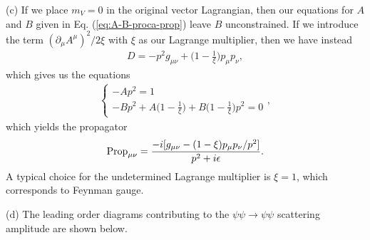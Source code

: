 {(c) If we place $m_{V} = 0$ in the original vector Lagrangian, then our equations for $A$ and $B$ given in Eq. (\ref{eq:A-B-proca-prop}) leave $B$ unconstrained.
If we introduce the term $(\partial_{\mu} A^{\mu})^2 / 2 \xi$ with $\xi$ as our Lagrange multiplier, then we have instead
\begin{align}
    D = - p^2 g_{\mu\nu} + \Big( 1 - \frac{1}{\xi} \Big) p_{\mu} p_{\nu}
,\end{align}
which gives us the equations
\begin{align}
\begin{cases}
    - A p^2 = 1 \\
    - B p^2 + A \Big( 1 - \frac{1}{\xi} \Big) + B \Big( 1 - \frac{1}{\xi} \Big) p^2 = 0
\end{cases}
,\end{align}
which yields the propagator
\begin{align}
    {\rm Prop}_{\mu\nu} = \frac{-i [ g_{\mu\nu} - (1 - \xi) p_{\mu} p_{\nu} / p^2 ]}{p^2 + i \epsilon}
.\end{align}
A typical choice for the undetermined Lagrange multiplier is $\xi = 1$, which corresponds to Feynman gauge.


(d) The leading order diagrams contributing to the $\psi \psi \rightarrow \psi \psi$ scattering amplitude are shown below.

\begin{center}
\end{center}

}
